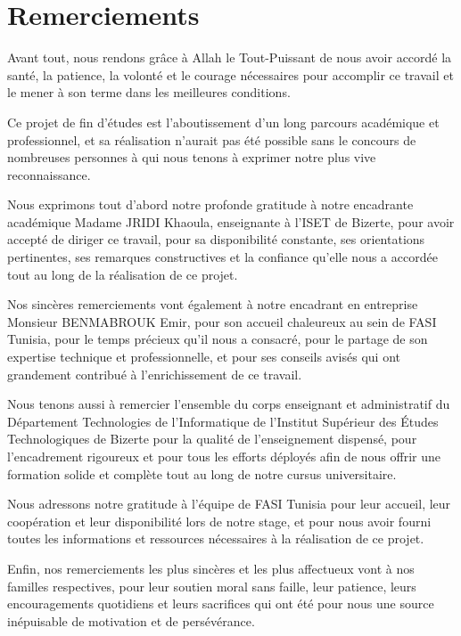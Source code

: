 \documentclass[a4paper,12pt]{report}
\begin{document}
\chapter*{Remerciements}

Avant tout, nous rendons grâce à Allah le Tout-Puissant de nous avoir accordé la santé, la patience, la volonté et le courage nécessaires pour accomplir ce travail et le mener à son terme dans les meilleures conditions.

Ce projet de fin d'études est l'aboutissement d'un long parcours académique et professionnel, et sa réalisation n'aurait pas été possible sans le concours de nombreuses personnes à qui nous tenons à exprimer notre plus vive reconnaissance.

Nous exprimons tout d'abord notre profonde gratitude à notre encadrante académique Madame JRIDI Khaoula, enseignante à l'ISET de Bizerte, pour avoir accepté de diriger ce travail, pour sa disponibilité constante, ses orientations pertinentes, ses remarques constructives et la confiance qu'elle nous a accordée tout au long de la réalisation de ce projet.

Nos sincères remerciements vont également à notre encadrant en entreprise Monsieur BENMABROUK Emir, pour son accueil chaleureux au sein de FASI Tunisia, pour le temps précieux qu'il nous a consacré, pour le partage de son expertise technique et professionnelle, et pour ses conseils avisés qui ont grandement contribué à l'enrichissement de ce travail.

Nous tenons aussi à remercier l'ensemble du corps enseignant et administratif du Département Technologies de l'Informatique de l'Institut Supérieur des Études Technologiques de Bizerte pour la qualité de l'enseignement dispensé, pour l'encadrement rigoureux et pour tous les efforts déployés afin de nous offrir une formation solide et complète tout au long de notre cursus universitaire.

Nous adressons notre gratitude à l'équipe de FASI Tunisia pour leur accueil, leur coopération et leur disponibilité lors de notre stage, et pour nous avoir fourni toutes les informations et ressources nécessaires à la réalisation de ce projet.

Enfin, nos remerciements les plus sincères et les plus affectueux vont à nos familles respectives, pour leur soutien moral sans faille, leur patience, leurs encouragements quotidiens et leurs sacrifices qui ont été pour nous une source inépuisable de motivation et de persévérance.
\end{document}
